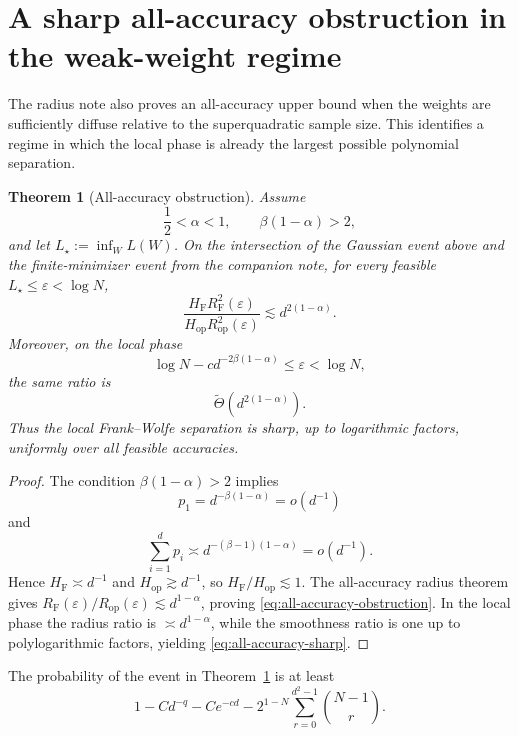 \documentclass[11pt]{article}
\newtheorem{theorem}{Theorem}[section]
\newcommand{\eps}{\varepsilon}
\newcommand{\RF}{R_{\mathrm F}}
\newcommand{\Rop}{R_{\mathrm{op}}}
\newcommand{\HF}{H_{\mathrm F}}
\newcommand{\Hop}{H_{\mathrm{op}}}
\begin{document}
\section{A sharp all-accuracy obstruction in the weak-weight regime}

The radius note also proves an all-accuracy upper bound when the weights
are sufficiently diffuse relative to the superquadratic sample size.
This identifies a regime in which the local phase is already the largest
possible polynomial separation.

\begin{theorem}[All-accuracy obstruction]
\label{thm:obstruction}
Assume
\[
 \frac12<\alpha<1,
 \qquad
 \beta(1-\alpha)>2,
\]
and let $L_\star:=\inf_WL(W)$.  On the intersection of the Gaussian
event above and the finite-minimizer event from the companion note,
for every feasible $L_\star\leq\eps<\log N$,
\begin{equation}
 \frac{\HF\RF^2(\eps)}{\Hop\Rop^2(\eps)}
 \lesssim d^{2(1-\alpha)}.
 \label{eq:all-accuracy-obstruction}
\end{equation}
Moreover, on the local phase
\[
 \log N-cd^{-2\beta(1-\alpha)}\leq\eps<\log N,
\]
the same ratio is
\begin{equation}
 \widetilde\Theta\!\left(d^{2(1-\alpha)}\right).
 \label{eq:all-accuracy-sharp}
\end{equation}
Thus the local Frank--Wolfe separation is sharp, up to logarithmic
factors, uniformly over all feasible accuracies.
\end{theorem}

\begin{proof}
The condition $\beta(1-\alpha)>2$ implies
\[
 p_1=d^{-\beta(1-\alpha)}=o(d^{-1})
\]
and
\[
 \sum_{i=1}^{d}p_i
 \asymp d^{-(\beta-1)(1-\alpha)}=o(d^{-1}).
\]
Hence $\HF\asymp d^{-1}$ and $\Hop\gtrsim d^{-1}$, so
$\HF/\Hop\lesssim1$.  The all-accuracy radius theorem gives
$\RF(\eps)/\Rop(\eps)\lesssim d^{1-\alpha}$, proving
\eqref{eq:all-accuracy-obstruction}.  In the local phase the radius
ratio is $\asymp d^{1-\alpha}$, while the smoothness ratio is one up to
polylogarithmic factors, yielding \eqref{eq:all-accuracy-sharp}.
\end{proof}

The probability of the event in Theorem~\ref{thm:obstruction} is at
least
\[
 1-Cd^{-q}-Ce^{-cd}
 -2^{1-N}\sum_{r=0}^{d^2-1}\binom{N-1}{r}.
\]
\end{document}
